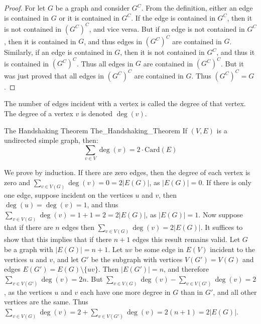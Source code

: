     \begin{proof}
        For let $G$ be a graph and consider $G^C$. From the definition,
        either an edge is contained in $G$ or it is contained in $G^C$. If
        the edge is contained in $G^C$, then it is not contained in
        $(G^C)^C$, and vice versa. But if an edge is not contained in $G^C$,
        then it is contained in $G$, and thus edges in $(G^C)^C$ are
        contained in $G$. Similarly, if an edge is contained in $G$, then it
        is not contained in $G^C$, and thus it is contained in $(G^C)^C$.
        Thus all edges in $G$ are contained in $(G^C)^C$. But it was just
        proved that all edges in $(G^C)^{C}$ are contained in $G$. Thus
        $(G^C)^{C}=G$.
    \end{proof}
    \begin{definition}
        The number of edges incident with a vertex is called the degree of
        that vertex. The degree of a vertex $v$ is denoted $\deg(v)$.
    \end{definition}
    \begin{ftheorem}{The Handshaking Theorem}
                    {The_Handshaking_Theorem}
        If $(V,E)$ is a undirected simple graph, then:
        \begin{equation}
            \sum_{v\in{V}}\deg(v)=2\cdot\mathrm{Card}(E)
        \end{equation}
    \end{ftheorem}
    \begin{bproof}
        We prove by induction. If there are zero edges, then the degree of
        each vertex is zero and $\sum_{v\in{V}(G)}\deg(v)=0=2|E(G)|$, as
        $|E(G)|=0$. If there is only one edge, suppose incident on the
        vertices $u$ and $v$, then $\deg(u)=\deg(v)=1$, and thus
        $\sum_{v\in{V}(G)}\deg(v)=1+1=2=2|E(G)|$, as $|E(G)|=1$. Now suppose
        that if there are $n$ edges then $\sum_{v\in{V}(G)}\deg(v)=2|E(G)|$.
        It suffices to show that this implies that if there $n+1$ edges this
        result remains valid. Let $G$ be a graph with $|E(G)|=n+1$. Let $uv$
        be some edge in $E(V)$ incident to the vertices $u$ and $v$, and let
        $G'$ be the subgraph with vertices $V(G')=V(G)$ and edges
        $E(G')=E(G)\setminus\{uv\}$. Then $|E(G')|=n$, and therefore
        $\sum_{v\in{V}(G')}\deg(v)=2n$. But
        $\sum_{v\in V(G)}\deg(v)-\sum_{v\in V(G')}\deg(v)=2$, as the
        vertices $u$ and $v$ each have one more degree in $G$ than in $G'$,
        and all other vertices are the same. Thus
        $\sum_{v\in V(G)}\deg(v)=2+\sum_{v\in V(G')}\deg(v)=2(n+1)=2|E(G)|$.
    \end{bproof}
